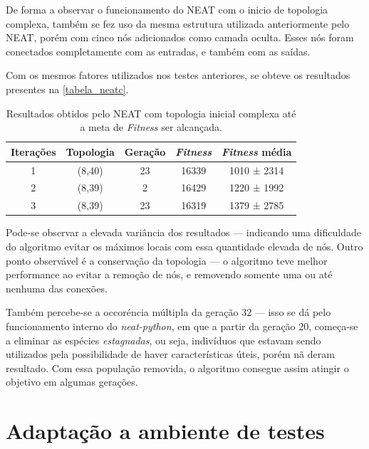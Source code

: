 De forma a observar o funcionamento do NEAT com o inicio de topologia complexa,
tamb{\'e}m se fez uso da mesma estrutura utilizada anteriormente pelo NEAT, por{\'e}m com
cinco n{\'o}s adicionados como camada oculta. Esses n{\'o}s foram conectados completamente
com as entradas, e tamb{\'e}m com as sa{\'i}das.

Com os mesmos fatores utilizados nos testes anteriores, se obteve os resultados
presentes na \autoref{tabela_neatc}.

\begin{table}[htb]
	\centering
    \caption{\label{tabela_neatc}Resultados obtidos pelo NEAT com topologia inicial complexa até a meta de \textit{Fitness} ser alcançada.}
    \begin{tabular}{ccccc}
        \hline
		\textbf{Itera{\c c}{\~o}es} & \textbf{Topologia} & \textbf{Gera{\c c}{\~a}o} & \textbf{\textit{Fitness}} & \textbf{\textit{Fitness} média} \\ \hline
		1 & (8,40)  & 23  & 16339  & 1010 ± 2314   \\ \hline
		2 & (8,39)  & 2   & 16429  & 1220 ± 1992   \\ \hline
		3 & (8,39)  & 23  & 16319  & 1379 ± 2785   \\ \hline
    \end{tabular}
\end{table}

Pode-se observar a elevada vari{\^a}ncia dos resultados — indicando uma
dificuldade do algoritmo evitar os m{\'a}ximos locais com essa quantidade
elevada de n{\'o}s. Outro ponto observável é a conservação da topologia — o algoritmo
teve melhor performance ao evitar a remo{\c c}{\~a}o de nós, e removendo
somente uma ou at{\'e} nenhuma das conex{\~o}es.

Tamb{\'e}m percebe-se a occor{\'e}ncia m{\'u}ltipla da gera{\c c}{\~a}o 32 —
isso se d{\'a} pelo funcionamento interno do \textit{neat-python}, em que a
partir da gera{\c c}{\~a}o 20, come{\c c}a-se a eliminar as esp{\'e}cies
\textit{estagnadas}, ou seja, indiv{\'i}duos que estavam sendo utilizados pela
possibilidade de haver caracter{\'i}sticas {\'u}teis, por{\'e}m n{\~a} deram
resultado. Com essa popula{\c c}{\~a}o removida, o algoritmo consegue assim
atingir o objetivo em algumas gera{\c c}{\~o}es.

\section{Adapta{\c c}{\~a}o a ambiente de testes}

